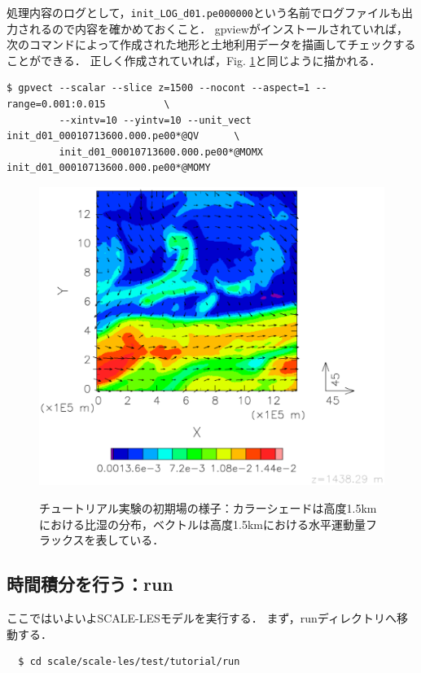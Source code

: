 処理内容のログとして，\verb|init_LOG_d01.pe000000|という名前でログファイルも出力されるので内容を確かめておくこと．
gpviewがインストールされていれば，次のコマンドによって作成された地形と土地利用データを描画してチェックすることができる．
正しく作成されていれば，Fig. \ref{fig:init}と同じように描かれる．

\begin{verbatim}
$ gpvect --scalar --slice z=1500 --nocont --aspect=1 --range=0.001:0.015          \
         --xintv=10 --yintv=10 --unit_vect init_d01_00010713600.000.pe00*@QV      \
         init_d01_00010713600.000.pe00*@MOMX init_d01_00010713600.000.pe00*@MOMY
\end{verbatim}


\begin{figure}[h]
\begin{center}
  \includegraphics[width=0.7\hsize]{./figure/init_qv-momxy.eps}\\
  \caption{チュートリアル実験の初期場の様子：カラーシェードは高度1.5kmにおける比湿の分布，ベクトルは高度1.5kmにおける水平運動量フラックスを表している．}
  \label{fig:init}
\end{center}
\end{figure}


\subsection{時間積分を行う：run}

ここではいよいよSCALE-LESモデルを実行する．
まず，runディレクトリへ移動する．
\begin{verbatim}
  $ cd scale/scale-les/test/tutorial/run
\end{verbatim}


